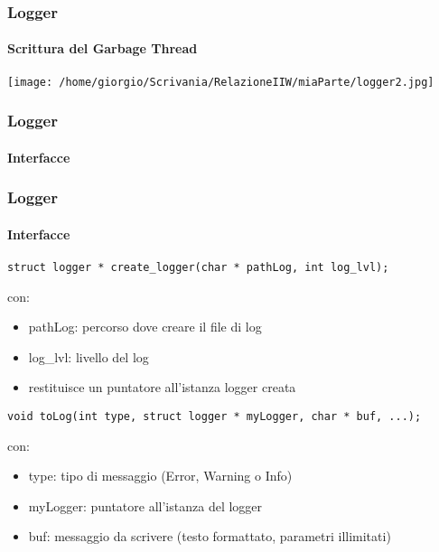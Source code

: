 \documentclass{beamer}
\begin{document}
\begin{frame}
\frametitle{Logger}
\framesubtitle{Scrittura del Garbage Thread}


\begin{center}
\texttt{[image: /home/giorgio/Scrivania/RelazioneIIW/miaParte/logger2.jpg]}
\end{center}




\end{frame}
\frametitle{Logger}
\framesubtitle{Interfacce}
\begin{frame}[fragile]
\frametitle{Logger}
\framesubtitle{Interfacce}
\scriptsize
\begin{lstlisting}
struct logger * create_logger(char * pathLog, int log_lvl);
\end{lstlisting}
\normalsize

con:

\begin{itemize}
\item pathLog: percorso dove creare il file di log
\item log\_lvl: livello del log
\item restituisce un puntatore all'istanza logger creata
\end{itemize}
\scriptsize
\begin{lstlisting}
void toLog(int type, struct logger * myLogger, char * buf, ...);
\end{lstlisting}
\normalsize

con:

\begin{itemize}
\item type: tipo di messaggio (Error, Warning o Info)
\item myLogger: puntatore all'istanza del logger
\item buf: messaggio da scrivere (testo formattato, parametri illimitati)
\end{itemize}
\end{frame}
\end{document}

